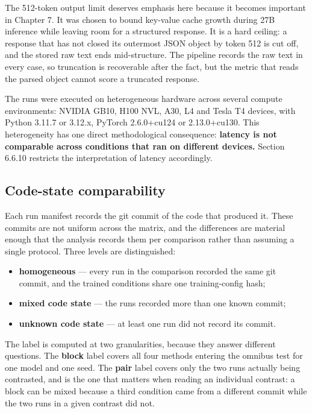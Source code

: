 The 512-token output limit deserves emphasis here because it becomes important in Chapter 7. It was chosen to bound key-value cache growth during 27B inference while leaving room for a structured response. It is a hard ceiling: a response that has not closed its outermost JSON object by token 512 is cut off, and the stored raw text ends mid-structure. The pipeline records the raw text in every case, so truncation is recoverable after the fact, but the metric that reads the parsed object cannot score a truncated response.

The runs were executed on heterogeneous hardware across several compute environments: NVIDIA GB10, H100 NVL, A30, L4 and Tesla T4 devices, with Python 3.11.7 or 3.12.x, PyTorch 2.6.0+cu124 or 2.13.0+cu130. This heterogeneity has one direct methodological consequence: \textbf{latency is not comparable across conditions that ran on different devices.} Section 6.6.10 restricts the interpretation of latency accordingly.

\subsection{Code-state comparability}

Each run manifest records the git commit of the code that produced it. These commits are not uniform across the matrix, and the differences are material enough that the analysis records them per comparison rather than assuming a single protocol. Three levels are distinguished:

\begin{itemize}
\tightlist
\item
  \textbf{homogeneous} --- every run in the comparison recorded the same git commit, and the trained conditions share one training-config hash;
\item
  \textbf{mixed code state} --- the runs recorded more than one known commit;
\item
  \textbf{unknown code state} --- at least one run did not record its commit.
\end{itemize}

The label is computed at two granularities, because they answer different questions. The \textbf{block} label covers all four methods entering the omnibus test for one model and one seed. The \textbf{pair} label covers only the two runs actually being contrasted, and is the one that matters when reading an individual contrast: a block can be mixed because a third condition came from a different commit while the two runs in a given contrast did not.

